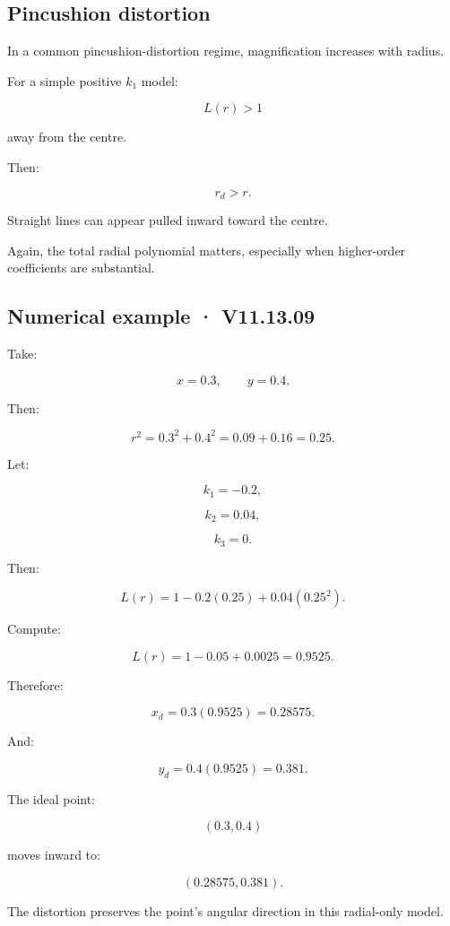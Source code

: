 \subsection{Pincushion distortion}\label{02-foundations-ii-ch035-pincushion-distortion}

In a common pincushion-distortion regime, magnification increases with radius.

For a simple positive \(k_1\) model:

\[
 L(r)>1
\]

away from the centre.

Then:

\[
 r_d>r.
\]

Straight lines can appear pulled inward toward the centre.

Again, the total radial polynomial matters, especially when higher-order coefficients are substantial.

\subsection{Numerical example · V11.13.09}\label{02-foundations-ii-ch035-numerical-example-v11.13.09}

Take:

\[
 x=0.3,\qquad y=0.4.
\]

Then:

\[
 r^2=0.3^2+0.4^2 =0.09+0.16 =\boxed{0.25}.
\]

Let:

\[
 k_1=-0.2,
\]

\[
 k_2=0.04,
\]

\[
 k_3=0.
\]

Then:

\[
 L(r)=1-0.2(0.25)+0.04(0.25^2).
\]

Compute:

\[
 L(r)=1-0.05+0.0025 =\boxed{0.9525}.
\]

Therefore:

\[
 x_d=0.3(0.9525) =\boxed{0.28575}.
\]

And:

\[
 y_d=0.4(0.9525) =\boxed{0.381}.
\]

The ideal point:

\[
 (0.3,0.4)
\]

moves inward to:

\[
 \boxed{(0.28575,0.381)}.
\]

The distortion preserves the point's angular direction in this radial-only model.


